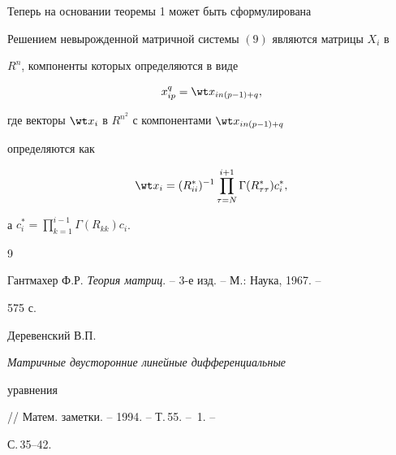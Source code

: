  


Теперь на основании теоремы 1 может быть сформулирована 


 


\begin{thm} 


Решением невырожденной матричной системы $(9)$ являются матрицы $X_i$ в 


$R^n$, компоненты которых определяются в виде 


$$ 


x^q_{ip}=\wt x_{in(p-1)+q}, 


$$ 


где векторы $\wt x_i$ в $R^{n^2}$ с компонентами $\wt x_{in(p-1)+q}$ 


определяются как 


$$ 


\wt x_i=(R^*_{ii})^{-1}\prod^{i+1}_{\tau=N} 


\Gamma(R^*_{\tau\tau})c^*_i, 


$$ 


а $c^*_i=\prod\limits^{i-1}_{k=1}\Gamma(R_{kk})c_i$. 


\end{thm} 


 


\begin{thebibliography}{9} 


 




Гантмахер Ф.Р. {\em Теория матриц}. -- 3-е изд. -- М.: Наука, 1967. -- 


575 с. 




Деревенский В.П. {\em Матричные двусторонние линейные дифференциальные 


уравнения} // Матем. заметки. -- 1994. -- Т.\,55. -- \No\,1. -- 


С.\,35--42. 


 


\end{thebibliography} 


 


\vskip 2cm 


 






 


\label{end} 


 



